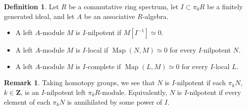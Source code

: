 \documentclass[12pt]{article}
\renewcommand{\rm}{\mdseries}
\theoremstyle{definition}
\newtheorem{definition}{Definition}[subsection]
\newtheorem{remark}{Remark}[subsection]
\newcommand{\ZZ}{\mathbf{Z}}
\DeclareMathOperator{\Map}{Map}
\begin{document}
\begin{definition}
Let $R$ be a commutative ring spectrum, let $I\subset\pi_0 R$ be a finitely generated ideal, and let $A$ be an associative $R$-algebra.
\begin{itemize}\itemsep.1em
\item[\rm{(1)}]
A left $A$-module $M$ is $I$-nilpotent if $M[I^{-1}]\simeq 0$.
\item[\rm{(2)}]
A left $A$-module $M$ is $I$-local if $\Map(N,M)\simeq 0$ for every $I$-nilpotent $N$.
\item[\rm{(3)}]
A left $A$-module $M$ is $I$-complete if $\Map(L,M)\simeq 0$ for every $I$-local $L$.
\end{itemize}
\end{definition}
\begin{remark}
Taking homotopy groups, we see that $N$ is $I$-nilpotent if each $\pi_k N$, $k\in\ZZ$, is an $I$-nilpotent left $\pi_0 R$-module.
Equivalently, $N$ is $I$-nilpotent if every element of each $\pi_k N$ is annihilated by some power of $I$.
\end{remark}
\end{document}
